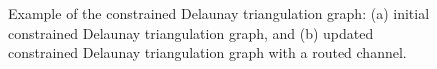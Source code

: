 \documentclass[journal]{IEEEtran}
\begin{document}
\begin{figure}[htbp]
\centering
{}%
\hfil
%
\caption{Example of the constrained Delaunay triangulation graph: (a) initial constrained Delaunay triangulation graph, and (b) updated constrained Delaunay triangulation graph with a routed channel. }
\label{fig:DTGExampleCD}
\end{figure}
\end{document}
